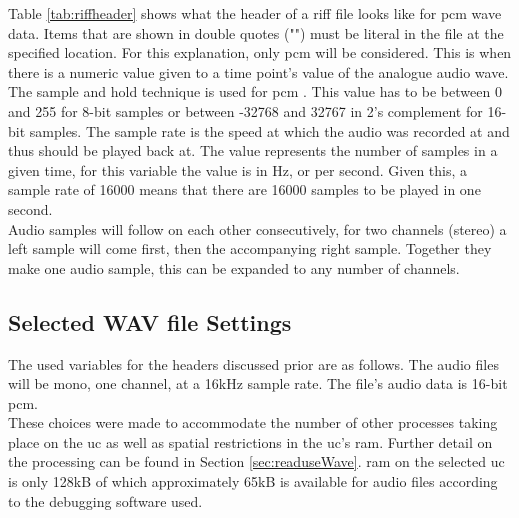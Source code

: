 \documentclass[12pt,a4paper]{report}
\begin{document}
Table \ref{tab:riffheader} shows what the header of a \ac{riff} file looks like for \ac{pcm} wave data. Items that are shown in double quotes ("") must be literal in the file at the specified location. For this explanation, only \ac{pcm} will be considered. This is when there is a numeric value given to a time point's value of the analogue audio wave. The sample and hold technique is used for \ac{pcm} \cite{pcm}. This value has to be between 0 and 255 for 8-bit samples or between -32768 and 32767 in 2's complement for 16-bit samples. The sample rate is the speed at which the audio was recorded at and thus should be played back at. The value represents the number of samples in a given time, for this variable the value is in Hz, or per second. Given this, a sample rate of 16000 means that there are 16000 samples to be played in one second.\\
Audio samples will follow on each other consecutively, for two channels (stereo) a left sample will come first, then the accompanying right sample. Together they make one audio sample, this can be expanded to any number of channels. 
\subsection{Selected WAV file Settings} \label{sec:chosenWav}
The used variables for the headers discussed prior are as follows. The audio files will be mono, one channel, at a 16kHz sample rate. The file's audio data is 16-bit \ac{pcm}.\\
These choices were made to accommodate the number of other processes taking place on the \ac{uc} as well as spatial restrictions in the \ac{uc}'s \ac{ram}. Further detail on the processing can be found in Section \ref{sec:readuseWave}. \ac{ram} on the selected \ac{uc} is only 128kB \cite{f411} of which approximately 65kB is available for audio files according to the debugging software used.
\end{document}
